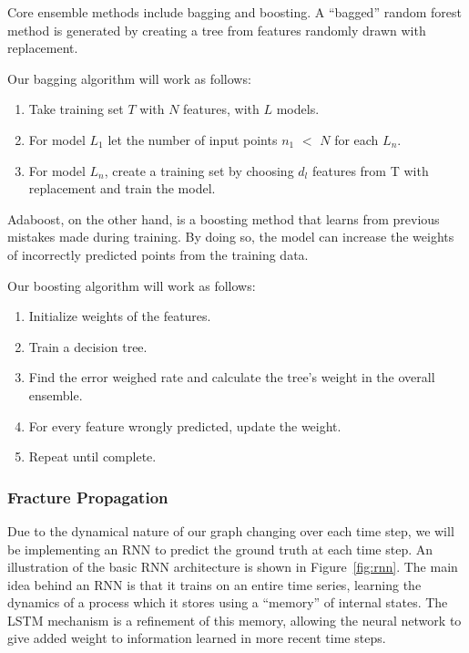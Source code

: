 Core ensemble methods include bagging and boosting. A ``bagged'' random forest method is generated by creating a tree from features randomly drawn with replacement. 

Our bagging algorithm will work as follows:

\begin{enumerate}
\item Take training set $T$ with $N$ features, with $L$ models.
\item For model $L _{1}$ let the number of input points $n_{1}$ $<$ $N$ for each $L_{n}$.
\item For model $L_{n}$, create a training set by choosing $d_{l}$ features from T with replacement and train the model.
\end{enumerate}

Adaboost, on the other hand, is a boosting method that learns from previous mistakes made during training. By doing so, the model can increase the weights of incorrectly predicted points from the training data.

Our boosting algorithm will work as follows:

\begin{enumerate}
    \item Initialize weights of the features.
    \item Train a decision tree.
    \item Find the error weighed rate and calculate the tree's weight in the overall ensemble.
    \item For every feature wrongly predicted, update the weight.
    \item Repeat until complete. 
\end{enumerate}


\subsubsection{Fracture Propagation}
Due to the dynamical nature of our graph changing over each time step, we will be implementing an RNN to predict the ground truth at each time step. An illustration of the basic RNN architecture is shown in Figure~\ref{fig:rnn}.  The main idea behind an RNN is that it trains on an entire time series, learning the dynamics of a process which it stores using a ``memory'' of internal states.  The LSTM mechanism is a refinement of this memory, allowing the neural network to give added weight to information learned in more recent time steps.

